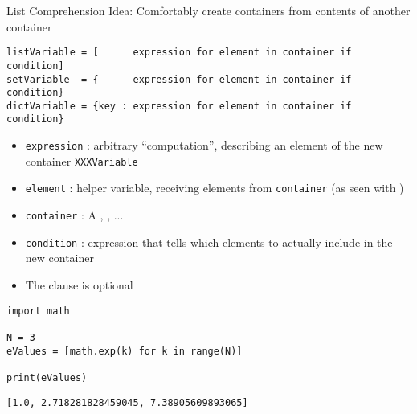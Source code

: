 
\begin{frame}[fragile]{List Comprehension}
%
Idea: Comfortably create containers from contents of another container
\begin{codebox}
\begin{verbatim}
listVariable = [      expression for element in container if condition]
setVariable  = {      expression for element in container if condition}
dictVariable = {key : expression for element in container if condition}
\end{verbatim}
\end{codebox}
%
\begin{itemize}
\item \texttt{expression} : arbitrary \enquote{computation}, describing an element of the new container \texttt{XXXVariable}
\item \texttt{element}    : helper variable, receiving elements from \texttt{container} (as seen with )
\item \texttt{container}  : A , , ...
\item \texttt{condition}  : expression that tells which elements to actually include in the new container
\item The  clause is optional
\end{itemize}
%
\end{frame}


\begin{frame}[fragile]
%
\begin{codebox}
\begin{verbatim}
import math

N = 3
eValues = [math.exp(k) for k in range(N)]

print(eValues)
\end{verbatim}
\end{codebox}
%
\begin{cmdbox}
\begin{verbatim}
[1.0, 2.718281828459045, 7.38905609893065]
\end{verbatim}
\end{cmdbox}
%
\end{frame}

